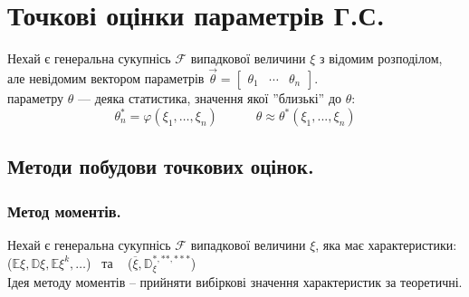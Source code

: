\section{Точкові оцінки параметрів Г.С.}
\vspace*{-2em}
Нехай є генеральна сукупнісь $\mathcal{F}$ випадкової величини $\xi$ з відомим розподілом, але невідомим вектором параметрів $\overrightarrow{\theta} = \begin{bmatrix}
 \theta_1 & \cdots & \theta_n
\end{bmatrix}$.\\
  параметру $\theta$ --- деяка статистика, значення  якої ''близькі'' до $\theta$:
$$
\theta_n^* = \varphi(\xi_1 , \dots, \xi_n) \qquad \quad \theta \approx \theta^* (\xi_1 , ... , \xi_n)
$$
\vspace*{-4.5em}
\subsection{Методи побудови точкових оцінок.}
\vspace*{-1em}
\subsubsection{Метод моментів.}
\vspace*{-1em}
Нехай є генеральна сукупнісь $\mathcal{F}$ випадкової величини $\xi$, яка має характеристики:\\
{\centering
	 ($\mathbb{E}\xi, \mathbb{D}\xi, \mathbb{E} \xi^k , \dots$)
	\ та \
	  ($\overline{\xi}, \mathbb{D}^{*, **,***}_\xi$)\\
}
Ідея методу моментів -- прийняти вибіркові значення характеристик за теоретичні.
\vspace*{-1.5em}
